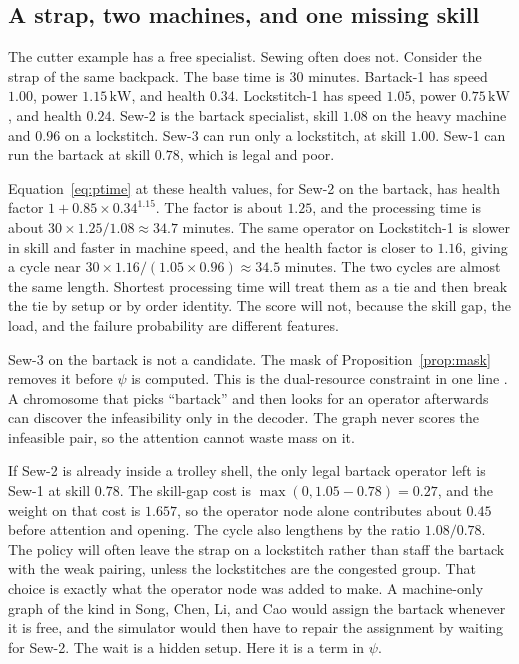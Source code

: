\subsection{A strap, two machines, and one missing skill}

The cutter example has a free specialist. Sewing often does not. Consider the strap of the same backpack. The base time is \(30\) minutes. Bartack-1 has speed \(1.00\), power \(1.15\,\mathrm{kW}\), and health \(0.34\). Lockstitch-1 has speed \(1.05\), power \(0.75\,\mathrm{kW}\), and health \(0.24\). Sew-2 is the bartack specialist, skill \(1.08\) on the heavy machine and \(0.96\) on a lockstitch. Sew-3 can run only a lockstitch, at skill \(1.00\). Sew-1 can run the bartack at skill \(0.78\), which is legal and poor.

Equation~\eqref{eq:ptime} at these health values, for Sew-2 on the bartack, has health factor \(1 + 0.85 \times 0.34^{1.15}\). The factor is about \(1.25\), and the processing time is about \(30 \times 1.25 / 1.08 \approx 34.7\) minutes. The same operator on Lockstitch-1 is slower in skill and faster in machine speed, and the health factor is closer to \(1.16\), giving a cycle near \(30 \times 1.16 / (1.05 \times 0.96) \approx 34.5\) minutes. The two cycles are almost the same length. Shortest processing time will treat them as a tie and then break the tie by setup or by order identity. The score will not, because the skill gap, the load, and the failure probability are different features.

Sew-3 on the bartack is not a candidate. The mask of Proposition~\ref{prop:mask} removes it before \(\psi\) is computed. This is the dual-resource constraint in one line \cite{xu2011}. A chromosome that picks ``bartack'' and then looks for an operator afterwards can discover the infeasibility only in the decoder. The graph never scores the infeasible pair, so the attention cannot waste mass on it.

If Sew-2 is already inside a trolley shell, the only legal bartack operator left is Sew-1 at skill \(0.78\). The skill-gap cost is \(\max(0, 1.05 - 0.78) = 0.27\), and the weight on that cost is \(1.657\), so the operator node alone contributes about \(0.45\) before attention and opening. The cycle also lengthens by the ratio \(1.08/0.78\). The policy will often leave the strap on a lockstitch rather than staff the bartack with the weak pairing, unless the lockstitches are the congested group. That choice is exactly what the operator node was added to make. A machine-only graph of the kind in Song, Chen, Li, and Cao \cite{song2023} would assign the bartack whenever it is free, and the simulator would then have to repair the assignment by waiting for Sew-2. The wait is a hidden setup. Here it is a term in \(\psi\).

